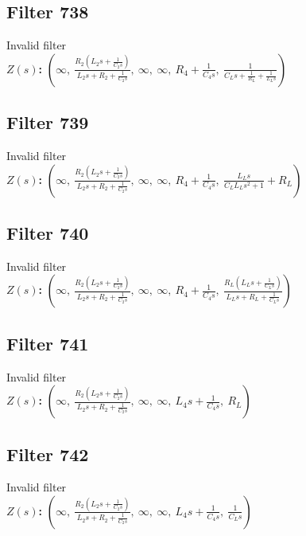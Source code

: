 \documentclass{article}
\begin{document}
\subsection*{Filter 738}
Invalid filter \\ 
\textbf{$Z(s)$:} $\left( \infty, \  \frac{R_{2} \left(L_{2} s + \frac{1}{C_{2} s}\right)}{L_{2} s + R_{2} + \frac{1}{C_{2} s}}, \  \infty, \  \infty, \  R_{4} + \frac{1}{C_{4} s}, \  \frac{1}{C_{L} s + \frac{1}{R_{L}} + \frac{1}{L_{L} s}}\right)$ \\ 
\subsection*{Filter 739}
Invalid filter \\ 
\textbf{$Z(s)$:} $\left( \infty, \  \frac{R_{2} \left(L_{2} s + \frac{1}{C_{2} s}\right)}{L_{2} s + R_{2} + \frac{1}{C_{2} s}}, \  \infty, \  \infty, \  R_{4} + \frac{1}{C_{4} s}, \  \frac{L_{L} s}{C_{L} L_{L} s^{2} + 1} + R_{L}\right)$ \\ 
\subsection*{Filter 740}
Invalid filter \\ 
\textbf{$Z(s)$:} $\left( \infty, \  \frac{R_{2} \left(L_{2} s + \frac{1}{C_{2} s}\right)}{L_{2} s + R_{2} + \frac{1}{C_{2} s}}, \  \infty, \  \infty, \  R_{4} + \frac{1}{C_{4} s}, \  \frac{R_{L} \left(L_{L} s + \frac{1}{C_{L} s}\right)}{L_{L} s + R_{L} + \frac{1}{C_{L} s}}\right)$ \\ 
\subsection*{Filter 741}
Invalid filter \\ 
\textbf{$Z(s)$:} $\left( \infty, \  \frac{R_{2} \left(L_{2} s + \frac{1}{C_{2} s}\right)}{L_{2} s + R_{2} + \frac{1}{C_{2} s}}, \  \infty, \  \infty, \  L_{4} s + \frac{1}{C_{4} s}, \  R_{L}\right)$ \\ 
\subsection*{Filter 742}
Invalid filter \\ 
\textbf{$Z(s)$:} $\left( \infty, \  \frac{R_{2} \left(L_{2} s + \frac{1}{C_{2} s}\right)}{L_{2} s + R_{2} + \frac{1}{C_{2} s}}, \  \infty, \  \infty, \  L_{4} s + \frac{1}{C_{4} s}, \  \frac{1}{C_{L} s}\right)$ \\ 
\end{document}
